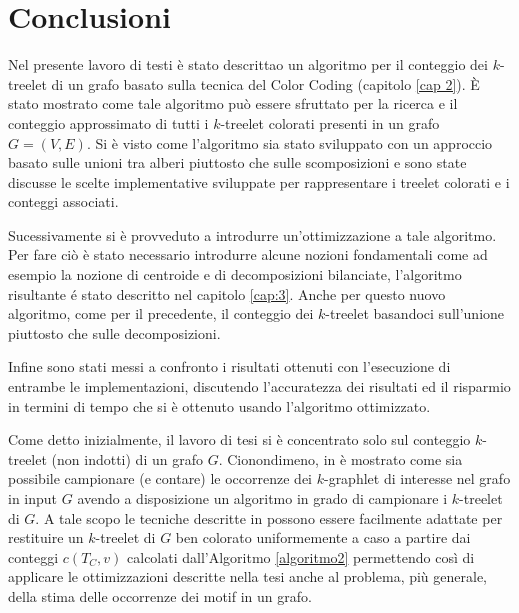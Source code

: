 \chapter{Conclusioni}
Nel presente lavoro di testi \`e stato descrittao  un algoritmo per il conteggio dei $ k $-treelet di un grafo basato sulla tecnica del Color Coding (capitolo \ref{cap 2}).
È stato mostrato come tale algoritmo pu\`o essere sfruttato per la ricerca e il conteggio approssimato di tutti i $ k $-treelet colorati presenti in un grafo $ G=(V,E) $.
Si \`e visto come  l'algoritmo sia stato sviluppato con un approccio basato sulle unioni tra alberi piuttosto che sulle scomposizioni e sono state discusse le scelte implementative sviluppate per rappresentare i treelet colorati e i conteggi associati.

Sucessivamente si \`e provveduto a introdurre un'ottimizzazione a tale algoritmo.\\
Per fare ci\`o \`e stato necessario introdurre alcune nozioni fondamentali come ad esempio la nozione di centroide e di decomposizioni bilanciate, l'algoritmo risultante \'e stato descritto nel capitolo \ref{cap:3}.
Anche per questo nuovo algoritmo, come per il precedente, il conteggio dei $ k $-treelet basandoci sull'unione piuttosto che sulle decomposizioni.

Infine sono stati messi a confronto i risultati ottenuti con l'esecuzione di entrambe le implementazioni, discutendo l'accuratezza dei risultati ed il risparmio in termini di tempo che si \`e ottenuto usando l'algoritmo ottimizzato.

Come detto inizialmente, il lavoro di tesi si \`e concentrato solo sul conteggio $ k $-treelet (non indotti) di un grafo $ G $. Cionondimeno, in \cite{bressan2018motif,bressan2019motivo} \`e mostrato come sia possibile campionare (e contare) le occorrenze dei $ k $-graphlet di interesse nel grafo in input $ G $ avendo a disposizione un algoritmo in grado di campionare i $ k $-treelet di $ G $.
A tale scopo le tecniche descritte in \cite{bressan2018motif,bressan2019motivo} possono essere facilmente adattate per restituire un $ k $-treelet di $ G $ ben colorato uniformemente a caso a partire dai conteggi $ c(T_C,v) $ calcolati dall'Algoritmo \ref{algoritmo2} permettendo così di applicare le ottimizzazioni descritte nella tesi anche al problema, più generale, della stima delle occorrenze dei motif in un grafo.

